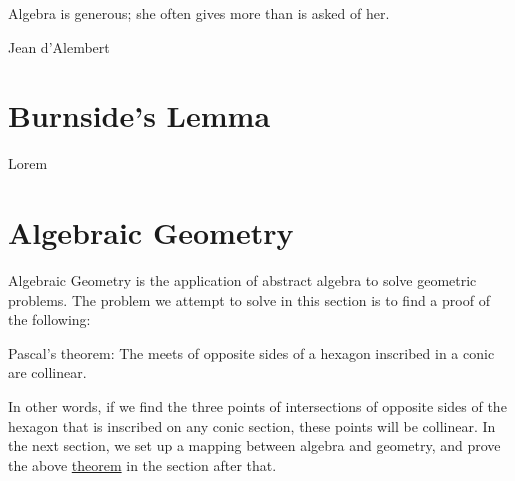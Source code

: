 \epigraph{Algebra is generous; she often gives more than is asked of her.}{Jean d’Alembert}

\section{Burnside's Lemma}
Lorem

\section{Algebraic Geometry}
Algebraic Geometry is the application of abstract algebra to solve geometric problems.
The problem we attempt to solve in this section is to find a proof of the following:
\begin{theorem} \label{theorem:pascals}
  Pascal's theorem: The meets of opposite sides of a hexagon inscribed in a conic are collinear.
\end{theorem}
In other words, if we find the three points of intersections of opposite sides of the hexagon that is inscribed on any conic section, these points will be collinear.
In the next section, we set up a mapping between algebra and geometry, and prove the above \hyperref[theorem:pascals]{theorem} in the section after that.

